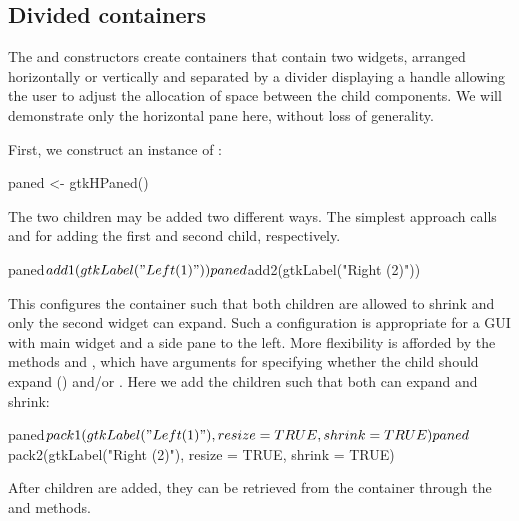 
\subsection{Divided containers}
\label{sec:RGtk2:gtkPanedWindow}

The  and  constructors
create containers that contain two widgets, arranged horizontally or
vertically and separated by a divider displaying a handle allowing the
user to adjust the allocation of space between the child
components. We will demonstrate only the horizontal pane
 here, without loss of generality.

First, we construct an instance of :
\begin{Schunk}
\begin{Sinput}
 paned <- gtkHPaned()
\end{Sinput}
\end{Schunk}

The two children may be added two different ways. The simplest
approach calls  and
 for adding the first and second child,
respectively. 
\begin{Schunk}
\begin{Sinput}
 paned$add1(gtkLabel("Left (1)"))
 paned$add2(gtkLabel("Right (2)"))
\end{Sinput}
\end{Schunk}
%
This configures the container such that both children are allowed to
shrink and only the second widget can expand. Such a configuration is
appropriate for a GUI with main widget and a side pane to the
left. More flexibility is afforded by the methods
 and , which have
arguments for specifying whether the child should expand
() and/or . Here we add the children such
that both can expand and shrink:
\begin{Schunk}
\begin{Sinput}
 paned$pack1(gtkLabel("Left (1)"), resize = TRUE, shrink = TRUE)
 paned$pack2(gtkLabel("Right (2)"), resize = TRUE, shrink = TRUE)
\end{Sinput}
\end{Schunk}
%
After children are added, they can be retrieved from the container
through the  and
 methods.

